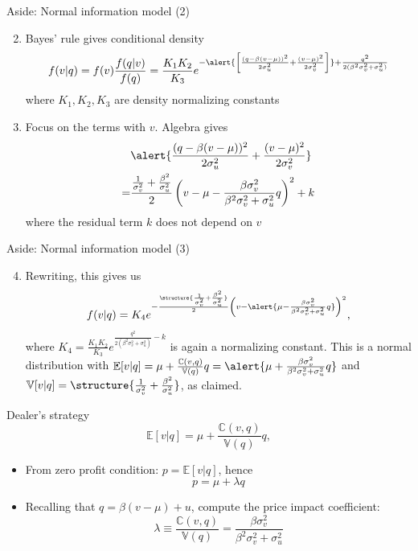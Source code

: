 \documentclass[english,10pt,aspectratio=169]{beamer}
\begin{document}
\begin{frame}{Aside: Normal information model (2)}
	\begin{enumerate}
		\setcounter{enumi}{1}
		\item Bayes' rule gives conditional density
		\[
		f(v|q) = f(v) \frac{f(q|v)}{f(q)} = \frac{K_1 K_2}{K_3} e^{-\alert{\left[\frac{(q-\beta(v-\mu))^2}{2\sigma^2_u }+\frac{(v-\mu)^2}{2\sigma^2_v}\right]} + \frac{q^2}{2(\beta^2 \sigma^2_v + \sigma^2_u)}}
		\]
		where $K_1, K_2, K_3$ are density normalizing constants
		\item Focus on the terms with \alert{$v$}. Algebra gives
		\begin{align*}
		&\alert{\frac{(q-\beta(v-\mu))^2}{2\sigma^2_u} + \frac{(v-\mu)^2}{2\sigma^2_v} }\\
		= &\frac{\frac{1}{\sigma^2_v}+\frac{\beta^2}{\sigma^2_u}}{2}\left(v-\mu-\frac{\beta \sigma^2_v}{\beta^2 \sigma^2_v + \sigma^2_u}q \right)^2 + k
		\end{align*}
		where the residual term $k$ does not depend on $v$
	\end{enumerate}
\end{frame}


\begin{frame}{Aside: Normal information model (3)}
	\begin{enumerate}
		\setcounter{enumi}{3}
		\item Rewriting, this gives us
		\[
			f(v|q) = K_4 e^{-\frac{\structure{\frac{1}{\sigma^2_v}+\frac{\beta^2}{\sigma^2_u}}}{2} \left(v-\alert{\mu-\frac{\beta \sigma^2_v}{\beta^2 \sigma^2_v + \sigma^2_u}q }\right)^2},
		\]
		where $K_4=\frac{K_1 K_2}{K_3}e^{ \frac{q^2}{2(\beta^2 \sigma^2_v + \sigma^2_u)}-k}$ is again a normalizing constant.
		This is  a normal distribution with $\mathbb{E}[v|q] = \mu + \frac{\mathbb{C}(v,q)}{\mathbb{V}(q)} q=\alert{\mu+\frac{\beta \sigma^2_v}{\beta^2 \sigma^2_v + \sigma^2_u}q}$ and $\mathbb{V}[v|q]=\structure{\frac{1}{\sigma^2_v}+\frac{\beta^2}{\sigma^2_u}}$, as claimed. 
	\end{enumerate}
\end{frame}


\begin{frame}{Dealer's strategy}
	\[
		\mathbb{E}[v|q] = \mu + \frac{\mathbb{C}(v,q)}{\mathbb{V}(q)} q,
	\]
	\begin{itemize}
		\item From zero profit condition: $p = \mathbb{E}[v|q]$, hence
		\[
			p = \mu + \lambda q
		\]
		\item Recalling that $q = \beta(v-\mu) + u$, compute the price impact coefficient: 
		\[
			\lambda \equiv \frac{\mathbb{C}(v,q)}{\mathbb{V}(q)} = \frac{\beta \sigma^2_v}{\beta^2 \sigma^2_v + \sigma^2_u}	
		\]
	\end{itemize}
\end{frame}
\end{document}
